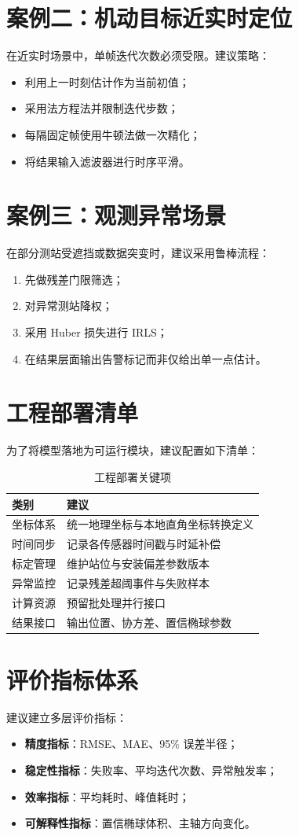 \section{案例二：机动目标近实时定位}
在近实时场景中，单帧迭代次数必须受限。建议策略：
\begin{itemize}
  \item 利用上一时刻估计作为当前初值；
  \item 采用法方程法并限制迭代步数；
  \item 每隔固定帧使用牛顿法做一次精化；
  \item 将结果输入滤波器进行时序平滑。
\end{itemize}

\section{案例三：观测异常场景}
在部分测站受遮挡或数据突变时，建议采用鲁棒流程：
\begin{enumerate}
  \item 先做残差门限筛选；
  \item 对异常测站降权；
  \item 采用 Huber 损失进行 IRLS；
  \item 在结果层面输出告警标记而非仅给出单一点估计。
\end{enumerate}

\section{工程部署清单}
为了将模型落地为可运行模块，建议配置如下清单：
\begin{table}[H]
\centering
\caption{工程部署关键项}
\begin{tabular}{ll}
\toprule
类别 & 建议 \\
\midrule
坐标体系 & 统一地理坐标与本地直角坐标转换定义 \\
时间同步 & 记录各传感器时间戳与时延补偿 \\
标定管理 & 维护站位与安装偏差参数版本 \\
异常监控 & 记录残差超阈事件与失败样本 \\
计算资源 & 预留批处理并行接口 \\
结果接口 & 输出位置、协方差、置信椭球参数 \\
\bottomrule
\end{tabular}
\end{table}

\section{评价指标体系}
建议建立多层评价指标：
\begin{itemize}
  \item \textbf{精度指标}：RMSE、MAE、95\% 误差半径；
  \item \textbf{稳定性指标}：失败率、平均迭代次数、异常触发率；
  \item \textbf{效率指标}：平均耗时、峰值耗时；
  \item \textbf{可解释性指标}：置信椭球体积、主轴方向变化。
\end{itemize}

